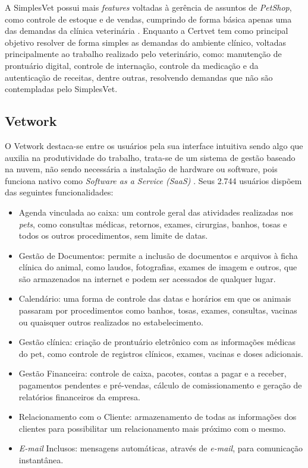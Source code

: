 \documentclass[
    12pt,               %
    openright,          %
    oneside,
    a4paper,            %
    BIBLATEX,           %
    TODO,               %
    english,            %
    brazil              %
    ]{ifsp-spo-inf-ctds}
\begin{document}
A SimplesVet possui mais \emph{features} voltadas à gerência de assuntos de \emph{PetShop}, como controle de estoque e de vendas, cumprindo de forma básica apenas uma das demandas da clínica veterinária . Enquanto a Certvet tem como principal objetivo resolver de forma simples as demandas do ambiente clínico, voltadas principalmente ao trabalho realizado pelo veterinário, como: manutenção de prontuário digital, controle de internação, controle da medicação e da autenticação de receitas, dentre outras, resolvendo demandas que não são contempladas pelo SimplesVet.

        \subsection{Vetwork}
        O Vetwork destaca-se entre os usuários pela sua interface intuitiva sendo algo que auxilia na produtividade do trabalho, trata-se de um sistema de gestão baseado na nuvem, não sendo necessária a instalação de hardware ou software, pois funciona nativo como \emph{Software as a Service (SaaS)} . Seus 2.744 usuários dispõem das seguintes funcionalidades:

\begin{itemize}
    \item Agenda vinculada ao caixa: um controle geral das atividades realizadas nos \emph{pets}, como consultas médicas, retornos, exames, cirurgias, banhos, tosas e todos os outros procedimentos, sem limite de datas.
    \item Gestão de Documentos: permite a inclusão de documentos e arquivos à ficha clínica do animal, como laudos, fotografias, exames de imagem e outros, que são armazenados na internet e podem ser acessados de qualquer lugar.
    \item Calendário: uma forma de controle das datas e horários em que os animais passaram por procedimentos como banhos, tosas, exames, consultas, vacinas ou quaisquer outros realizados no estabelecimento.
    \item Gestão clínica: criação de prontuário eletrônico com as informações médicas do pet, como controle de registros clínicos, exames, vacinas e doses adicionais.
    \item Gestão Financeira: controle de caixa, pacotes, contas a pagar e a receber, pagamentos pendentes e pré-vendas, cálculo de comissionamento e geração de relatórios financeiros da empresa.
    \item Relacionamento com o Cliente: armazenamento de todas as informações dos clientes para possibilitar um relacionamento mais próximo com o mesmo.
    \item \emph{E-mail} Inclusos: mensagens automáticas, através de \emph{e-mail}, para comunicação instantânea.
\end{itemize}
\end{document}

